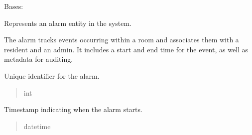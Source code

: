 \documentclass[letterpaper,10pt,english]{sphinxmanual}
\begin{document}
\begin{fulllineitems}
\label{\detokenize{app.mysql:app.mysql.alarm.Alarm}}
\pysigstartsignatures
\pysiglinewithargsret
{}
{}
{}
\pysigstopsignatures
\sphinxAtStartPar
Bases: 

\sphinxAtStartPar
Represents an alarm entity in the system.

\sphinxAtStartPar
The alarm tracks events occurring within a room and associates them
with a resident and an admin. It includes a start and end time for
the event, as well as metadata for auditing.

\begin{fulllineitems}
\label{\detokenize{app.mysql:app.mysql.alarm.Alarm.idAlarm}}
\pysigstartsignatures
\pysigline
{}
\pysigstopsignatures
\sphinxAtStartPar
Unique identifier for the alarm.
\begin{quote}\begin{description}
\sphinxAtStartPar
int

\end{description}\end{quote}

\end{fulllineitems}


\begin{fulllineitems}
\label{\detokenize{app.mysql:app.mysql.alarm.Alarm.start}}
\pysigstartsignatures
\pysigline
{}
\pysigstopsignatures
\sphinxAtStartPar
Timestamp indicating when the alarm starts.
\begin{quote}\begin{description}
\sphinxAtStartPar
datetime

\end{description}\end{quote}

\end{fulllineitems}



\end{fulllineitems}
\end{document}
